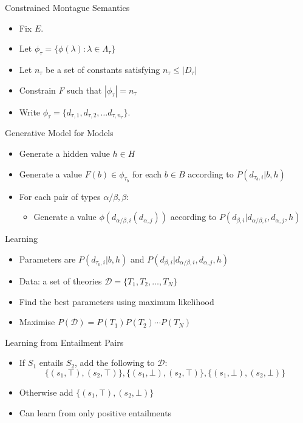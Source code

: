 \documentclass{beamer}
\newlength{\wideitemsep}
\let\olditem\item
\renewcommand{\item}{\setlength{\itemsep}{\wideitemsep}\olditem}
\begin{document}
\begin{frame}{Constrained Montague Semantics}
\begin{itemize}
\item Fix $E$.
\item Let $\phi_\tau = \{\phi(\lambda) : \lambda\in \Lambda_\tau\}$
\item Let $n_\tau$ be a set of constants satisfying $n_\tau \le |D_\tau|$
\item Constrain $F$ such that $|\phi_\tau| = n_\tau$
\item Write $\phi_\tau = \{d_{\tau,1}, d_{\tau,2}, \ldots d_{\tau,
    n_\tau}\}$.
\end{itemize}
\end{frame}

\begin{frame}{Generative Model for Models}
\begin{itemize}
\item Generate a hidden value $h\in H$
\item Generate a value $F(b) \in \phi_{\tau_b}$ for each $b\in B$ according to
  $P(d_{\tau_b,i}|b, h)$
\item For each pair of types $\alpha/\beta, \beta$:
\begin{itemize}
\item Generate a value $\phi(d_{\alpha/\beta,i}(d_{\alpha,j}))$
  according to $P(d_{\beta,i}|d_{\alpha/\beta,i}, d_{\alpha,j},h)$
\end{itemize}
\end{itemize}
\end{frame}

\begin{frame}{Learning}
  \begin{itemize}
  \item Parameters are $P(d_{\tau_b,i}|b, h)$ and $P(d_{\beta,i}|d_{\alpha/\beta,i}, d_{\alpha,j},h)$
  \item Data: a set of theories $\mathcal{D} = \{T_1, T_2, \ldots, T_N\}$
  \item Find the best parameters using maximum likelihood
  \item Maximise $P(\mathcal{D}) = P(T_1)P(T_2)\cdots P(T_N)$
  \end{itemize}
\end{frame}

\begin{frame}{Learning from Entailment Pairs}
  \begin{itemize}
    \item If $S_1$ entails $S_2$, add the following to $\mathcal{D}$:
      $$\{(s_1,\top),(s_2,\top)\}, \{(s_1,\bot),(s_2,\top)\},\{(s_1,\bot),(s_2,\bot)\}$$
    \item Otherwise add $\{(s_1,\top),(s_2,\bot)\}$
    \item Can learn from only positive entailments
  \end{itemize}
\end{frame}
\end{document}
